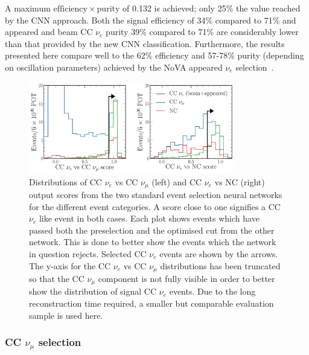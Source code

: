 A maximum $\mathrm{efficiency}\times\mathrm{purity}$ of 0.132 is achieved; only 25\% the value
reached by the CNN approach. Both the signal efficiency of 34\% compared to 71\% and appeared and
beam CC $\nu_{e}$ purity 39\% compared to 71\% are considerably lower than that provided by the
new CNN classification. Furthermore, the results presented here compare well to the 62\%
efficiency and 57-78\% purity (depending on oscillation parameters) achieved by the NoVA appeared
$\nu_{e}$ selection~\cite{acero2019}.

\begin{figure} %
    \includegraphics[width=0.8\textwidth]{diagrams/6-cvn/chipsnet/final_old_pid_outputs.pdf}
    \caption[Distributions of standard event selectio neural network output scores.]
    {Distributions of CC $\nu_{e}$ vs CC $\nu_{\mu}$ (left) and CC $\nu_{e}$ vs NC (right) output
        scores from the two standard event selection neural networks for the different event
        categories. A score close to one signifies a CC $\nu_{e}$ like event in both cases. Each
        plot shows events which have passed both the preselection and the optimised cut from the
        other network. This is done to better show the events which the network in question
        rejects. Selected CC $\nu_{e}$ events are shown by the arrows. The y-axis for the CC
        $\nu_{e}$ vs CC $\nu_{\mu}$ distributions has been truncated so that the CC $\nu_{\mu}$
        component is not fully visible in order to better show the distribution of signal CC
        $\nu_{e}$ events. Due to the long reconstruction time required, a smaller but comparable
        evaluation sample is used here.}
    \label{fig:final_old_pid_outputs}
\end{figure}

\subsubsection*{CC $\nu_{\mu}$ selection} %

